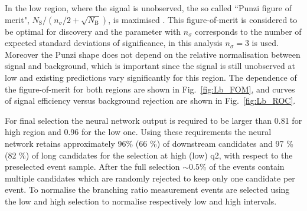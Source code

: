 In the low \qsq region, where the signal is unobserved, the so called ``Punzi figure of merit",
$N_{\mathrm{S}}/(n_\sigma/2+\sqrt{N_{\mathrm{B}}})$, is maximised \cite{Punzi:2003bu}.
This figure-of-merit is considered to be optimal for discovery and the parameter with $n_\sigma$ corresponds to
the number of expected standard deviations of significance, in this analysis $n_\sigma = 3$ is used.
Moreover the Punzi shape does not depend on the relative normalisation between signal and background, which
is important since the signal is still unobserved at low \qsq and existing predictions vary significantly
for this region. The dependence of the figure-of-merit for both \qsq regions are shown in Fig.~\ref{fig:Lb_FOM}, and curves
of signal efficiency versus background rejection are shown in Fig.~\ref{fig:Lb_ROC}.

For final selection the neural network output is required to be larger than 0.81 for high \qsq region
and 0.96 for the low \qsq one. Using these requirements the neural network retains approximately 96\% (66 \%)
of downstream candidates and 97 \% (82 \%) of long candidates for the selection at high (low) q2, with respect to
the preselected event sample. After the full selection $\sim 0.5$\% of the events contain multiple candidates
which are randomly rejected to keep only one candidate per event. 
%
%
To normalise the branching ratio measurement \jpsi events are selected using the low and high \qsq selection to normalise
respectively low and high \qsq intervals. 

%
%




